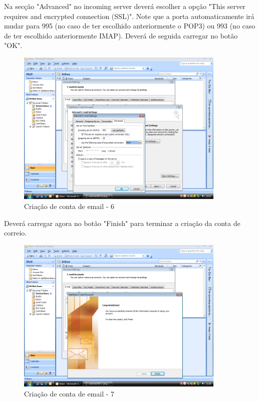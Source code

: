 Na secção "Advanced" no incoming server deverá escolher a opção "This server requires and encrypted connection (SSL)". Note que a porta automaticamente irá mudar para 995 (no caso de ter escolhido anteriormente o POP3) ou 993 (no caso de ter escolhido anteriormente IMAP). Deverá de seguida carregar no botão "OK".

\begin{figure}[H]
    \begin{center}
        \includegraphics[width=10cm]{include/img/outlook2007_7}
    \end{center}
    \caption{Criação de conta de email - 6}
    \label{fig:OUTLK2k77}
\end{figure}

Deverá carregar agora no botão "Finish" para terminar a criação da conta de correio.

\begin{figure}[H]
    \begin{center}
        \includegraphics[width=10cm]{include/img/outlook2007_8}
    \end{center}
    \caption{Criação de conta de email - 7}
    \label{fig:OUTLK2k78}
\end{figure}

